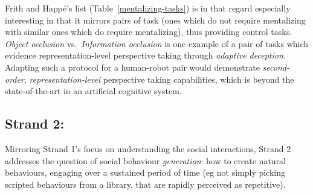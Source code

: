 Frith and Happé's list (Table~\ref{mentalizing-tasks}) is in that regard
especially interesting in that it mirrors pairs of task (ones which do not
require mentalizing with similar ones which do require mentalizing), thus
providing control tasks. \emph{Object occlusion} vs.~\emph{Information
occlusion} is one example of a pair of tasks which evidence
representation-level perspective taking through \emph{adaptive deception}.
Adapting such a protocol for a human-robot pair would demonstrate
\emph{second-order}, \emph{representation-level} perspective
taking capabilities, which is beyond the state-of-the-art in an artificial
cognitive system.






\subsection{Strand 2: \textbf{\wpThree}} 


Mirroring Strand 1's focus on understanding the social interactions, Strand 2
addresses the question of social behaviour \emph{generation}: how to create
natural behaviours, engaging over a sustained period of time (eg not simply
picking scripted behaviours from a library, that are rapidly perceived as
repetitive).

